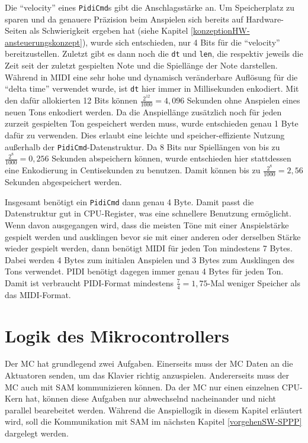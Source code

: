 Die \enquote{velocity} eines \lstinline{PidiCmd}s gibt die Anschlagsstärke an.
Um Speicherplatz zu sparen und da genauere Präzision beim Anspielen sich bereits auf Hardware-Seiten als Schwierigkeit ergeben hat (siehe Kapitel \ref{konzeptionHW-ansteuerungskonzept}), wurde sich entschieden, nur 4 Bits für die \enquote{velocity} bereitzustellen.
Zuletzt gibt es dann noch die \lstinline{dt} und \lstinline{len}, die respektiv jeweils die Zeit seit der zuletzt gespielten Note und die Spiellänge der Note darstellen.
Während in \ac{MIDI} eine sehr hohe und dynamisch veränderbare Auflösung für die \enquote{delta time} verwendet wurde, ist \lstinline{dt} hier immer in Millisekunden enkodiert.
Mit den dafür allokierten 12 Bits können $\frac{2^{12}}{1000} = 4,096$ Sekunden ohne Anspielen eines neuen Tons enkodiert werden.
Da die Anspiellänge zusätzlich noch für jeden zurzeit gespielten Ton gespeichert werden muss, wurde entschieden genau 1 Byte dafür zu verwenden.
Dies erlaubt eine leichte und speicher-effiziente Nutzung außerhalb der \lstinline{PidiCmd}-Datenstruktur.
Da 8 Bits nur Spiellängen von bis zu $\frac{2^8}{1000} = 0,256$ Sekunden abspeichern können, wurde entschieden hier stattdessen eine Enkodierung in Centisekunden zu benutzen.
Damit können bis zu $\frac{2^8}{1000} = 2,56$ Sekunden abgespeichert werden.

Insgesamt benötigt ein \lstinline{PidiCmd} dann genau 4 Byte.
Damit passt die Datenstruktur gut in CPU-Register, was eine schnellere Benutzung ermöglicht.
Wenn davon ausgegangen wird, dass die meisten Töne mit einer Anspielstärke gespielt werden und ausklingen bevor sie mit einer anderen oder derselben Stärke wieder gespielt werden, dann benötigt \ac{MIDI} für jeden Ton mindestens 7 Bytes.
Dabei werden 4 Bytes zum initialen Anspielen und 3 Bytes zum Ausklingen des Tons verwendet.
\ac{PIDI} benötigt dagegen immer genau 4 Bytes für jeden Ton.
Damit ist verbraucht \ac{PIDI}-Format mindestens $\frac{7}{4} = 1,75$-Mal weniger Speicher als das \ac{MIDI}-Format.


\section{Logik des Mikrocontrollers} \label{vorgehenSW-MC}

Der \ac{MC} hat grundlegend zwei Aufgaben.
Einerseits muss der \ac{MC} Daten an die Aktuatoren senden, um das Klavier richtig anzuspielen.
Andererseits muss der \ac{MC} auch mit \ac{SAM} kommunizieren können.
Da der \ac{MC} nur einen einzelnen CPU-Kern hat, können diese Aufgaben nur abwechselnd nacheinander und nicht parallel bearebeitet werden.
Während die Anspiellogik in diesem Kapitel erläutert wird, soll die Kommunikation mit \ac{SAM} im nächsten Kapitel \ref{vorgehenSW-SPPP} dargelegt werden.

